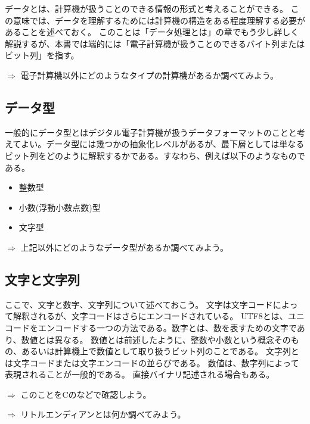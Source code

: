 データとは、計算機が扱うことのできる情報の形式と考えることができる。
この意味では、データを理解するためには計算機の構造をある程度理解する必要があることを述べておく。
このことは「データ処理とは」の章でもう少し詳しく解説するが、本書では端的には「電子計算機が扱うことのできるバイト列またはビット列」を指す。
\begin{breakbox}
$\Rightarrow$ 電子計算機以外にどのようなタイプの計算機があるか調べてみよう。
\end{breakbox}

\subsection{データ型}
一般的にデータ型とはデジタル電子計算機が扱うデータフォーマットのことと考えてよい。データ型には幾つかの抽象化レベルがあるが、最下層としては単なるビット列をどのように解釈するかである。すなわち、例えば以下のようなものである。
\begin{itemize}
\item 整数型
\item 小数(浮動小数点数)型
\item 文字型
\end{itemize}
\begin{breakbox}
$\Rightarrow$ 上記以外にどのようなデータ型があるか調べてみよう。
\end{breakbox}

\subsection{文字と文字列}
ここで、文字と数字、文字列について述べておこう。
文字は文字コードによって解釈されるが、文字コードはさらにエンコードされている。
UTF8とは、ユニコードをエンコードする一つの方法である。数字とは、数を表すための文字であり、数値とは異なる。
数値とは前述したように、整数や小数という概念そのもの、あるいは計算機上で数値として取り扱うビット列のことである。
文字列とは文字コードまたは文字エンコードの並らびである。
数値は、数字列によって表現されることが一般的である。
直接バイナリ記述される場合もある。
\begin{breakbox}
$\Rightarrow$ このことをCのなどで確認しよう。

$\Rightarrow$ リトルエンディアンとは何か調べてみよう。
\end{breakbox}

